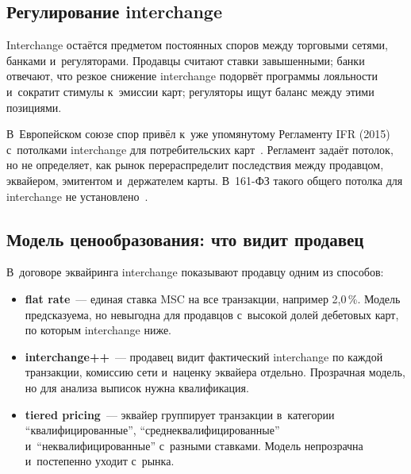 \subsection*{Регулирование interchange}

Interchange остаётся предметом постоянных споров между торговыми сетями,
банками и~регуляторами. Продавцы считают ставки завышенными; банки отвечают,
что резкое снижение interchange подорвёт программы лояльности и~сократит
стимулы к~эмиссии карт; регуляторы ищут баланс между этими позициями.

В~Европейском союзе спор привёл к~уже упомянутому Регламенту IFR (2015)
с~потолками interchange для потребительских карт~\cite{eu-ifr}. Регламент задаёт
потолок, но не определяет, как рынок перераспределит последствия между
продавцом, эквайером, эмитентом и~держателем карты. В~161-ФЗ такого общего
потолка для interchange не установлено~\cite{fz-161}.

\subsection*{Модель ценообразования: что видит продавец}

В~договоре эквайринга interchange показывают продавцу одним из способов:

\begin{itemize}
  \item \textbf{flat rate}~--- единая ставка MSC на все транзакции, например
    2,0\,\%. Модель предсказуема, но невыгодна для продавцов с~высокой
    долей дебетовых карт, по которым interchange ниже.
  \item \textbf{interchange++}~--- продавец видит фактический interchange по
    каждой транзакции, комиссию сети и~наценку эквайера отдельно.
    Прозрачная модель, но для анализа выписок нужна квалификация.
  \item \textbf{tiered pricing}~--- эквайер группирует транзакции в~категории
    \enquote{квалифицированные}, \enquote{среднеквалифицированные}
    и~\enquote{неквалифицированные} с~разными ставками. Модель непрозрачна
    и~постепенно уходит с~рынка.
\end{itemize}

